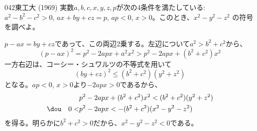 \begin{prob}{042}{}{東工大 (1969)}
 実数$a,b,c,x,y,z,p$が次の4条件を満たしている: $a^2-b^2-c^2>0$, $ax+by+cz=p$, $ap<0$, $x>0$。このとき、$x^2-y^2-z^2$ の符号を調べよ。
\end{prob}
$p-ax=by+cz$であって、この両辺2乗する。左辺について$a^2>b^2+c^2$から、
\[ (p-ax)^2=p^2-2apx+a^2x^2>p^2-2apx+(b^2+c^2)x^2 \]
一方右辺は、コーシー・シュワルツの不等式を用いて
\[ (by+cz)^2\le (b^2+c^2)(y^2+z^2) \]
となる。$ap<0$, $x>0$より$-2apx>0$であるから、
\begin{align*}
 &p^2-2apx+(b^2+c^2)x^2<(b^2+c^2)(y^2+z^2) \\
 \dou\quad 0<&p^2-2apx<-(b^2+c^2)(x^2-y^2-z^2)
\end{align*}
を得る。明らかに$b^2+c^2>0$だから、$x^2-y^2-z^2<0$である。